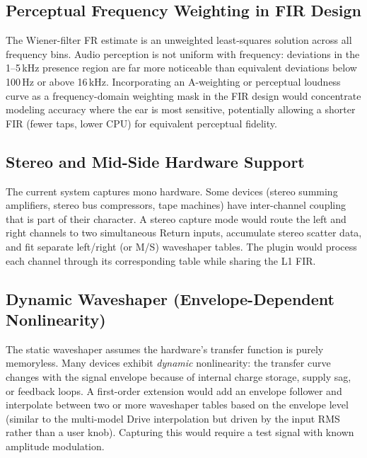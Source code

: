 \documentclass[11pt, letterpaper]{article}
\begin{document}
\subsection{Perceptual Frequency Weighting in FIR Design}

The Wiener-filter FR estimate is an unweighted least-squares solution across
all frequency bins.  Audio perception is not uniform with frequency: deviations
in the 1--5\,kHz presence region are far more noticeable than equivalent
deviations below 100\,Hz or above 16\,kHz.  Incorporating an A-weighting or
perceptual loudness curve as a frequency-domain weighting mask in the FIR
design would concentrate modeling accuracy where the ear is most sensitive,
potentially allowing a shorter FIR (fewer taps, lower CPU) for equivalent
perceptual fidelity.

\subsection{Stereo and Mid-Side Hardware Support}

The current system captures mono hardware.  Some devices (stereo summing
amplifiers, stereo bus compressors, tape machines) have inter-channel coupling
that is part of their character.  A stereo capture mode would route the left
and right channels to two simultaneous Return inputs, accumulate stereo scatter
data, and fit separate left/right (or M/S) waveshaper tables.  The plugin would
process each channel through its corresponding table while sharing the L1 FIR.

\subsection{Dynamic Waveshaper (Envelope-Dependent Nonlinearity)}

The static waveshaper assumes the hardware's transfer function is purely
memoryless.  Many devices exhibit \emph{dynamic} nonlinearity: the transfer
curve changes with the signal envelope because of internal charge storage,
supply sag, or feedback loops.  A first-order extension would add an envelope
follower and interpolate between two or more waveshaper tables based on the
envelope level (similar to the multi-model Drive interpolation but driven by
the input RMS rather than a user knob).  Capturing this would require a test
signal with known amplitude modulation.
\end{document}
